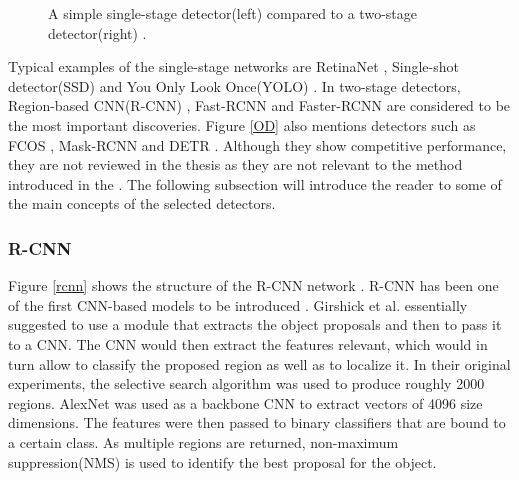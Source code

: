 \documentclass[english, 12pt, a4paper, elec, utf8, a-1b, online]{aaltothesis}
\begin{document}
\begin{figure}[htb]
    \centering
    \qquad
    \caption{A simple single-stage detector(left) compared to a two-stage detector(right) \cite{app8091488}.}\label{fig:1vs2stage}%
\end{figure}
\FloatBarrier

Typical examples of the single-stage networks are RetinaNet \cite{Lin2017}, Single-shot detector(SSD) \cite{Liu2015} and You Only Look Once(YOLO) \cite{Redmon2015a}. In two-stage detectors, Region-based CNN(R-CNN) \cite{Girshick2013}, Fast-RCNN \cite{Girshick2015} and Faster-RCNN \cite{ima} are considered to be the most important discoveries. Figure \ref{OD} also mentions detectors such as FCOS \cite{Tian2019}, Mask-RCNN \cite{He2017} and DETR \cite{Carion2020}. Although they show competitive performance, they are not reviewed in the thesis as they are not relevant to the method introduced in the .  The following subsection will introduce the reader to some of the main concepts of the selected detectors. 


\subsubsection{R-CNN}

Figure \ref{rcnn} shows the structure of the R-CNN network \cite{Girshick2013}. R-CNN has been one of the first CNN-based models to be introduced \cite{Zaidi2021}. Girshick et al. essentially suggested to use a module that extracts the object proposals and then to pass it to a CNN. The CNN would then extract the features relevant, which would in turn allow to classify the proposed region as well as to localize it. In their original experiments, the selective search algorithm  \cite{Uijlings13} was used to produce roughly 2000 regions. AlexNet  \cite{NIPS2012_c399862d} was used as a backbone CNN to extract vectors of 4096 size dimensions. The features were then passed to binary classifiers that are bound to a certain class. As multiple regions are returned, non-maximum suppression(NMS) \cite{Hosang2017}  is used to identify the best proposal for the object. 
\end{document}
